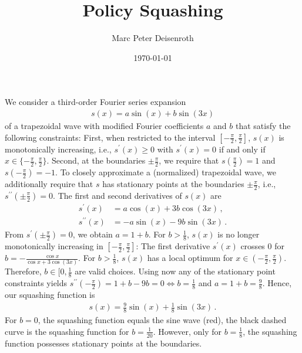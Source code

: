 \documentclass[11pt, a4paper]{article}
\title{Policy Squashing}
\author{Marc Peter Deisenroth}
\date{\today}
\begin{document}
\maketitle


We consider a third-order Fourier series expansion 
%
\begin{align*}
s(x) =  a\sin(x) + b\sin(3x)
\end{align*}
%
%
% 
of a trapezoidal wave with modified Fourier coefficients $a$ and $b$
that satisfy the following constraints: First, when restricted to the
interval $[-\tfrac{\pi}{2}, \tfrac{\pi}{2}]$, $s(x)$ is monotonically
increasing, i.e., $s^\prime(x) \geq 0$ with $s^\prime(x)=0$ if and
only if $x\in\{-\tfrac{\pi}{2}, \tfrac{\pi}{2}\}$. Second, at the
boundaries $\pm\tfrac{\pi}{2}$, we require that $s(\tfrac{\pi}{2}) =
1$ and $s(-\tfrac{\pi}{2}) = -1$.  To closely approximate a (normalized)
trapezoidal wave, we additionally require that $s$ has stationary
points at the boundaries $\pm\tfrac{\pi}{2}$, i.e.,
$s^{\prime\prime}(\pm\tfrac{\pi}{2}) = 0$. The first and second
derivatives of $s(x)$ are
%
\begin{align*}
s^\prime(x) &= a\cos (x) + 3b\cos(3x)\,,\\
s^{\prime\prime}(x) &= -a\sin(x) - 9b\sin(3x)\,.
\end{align*}
From $s^\prime(\pm\tfrac{\pi}{2})=0$, we obtain $a = 1+b$. For
$b>\tfrac{1}{8}$, $s(x)$ is no longer monotonically increasing in
$[-\tfrac{\pi}{2}, \tfrac{\pi}{2}]$: The first derivative
$s^\prime(x)$ crosses 0 for $b=-\tfrac{\cos x}{\cos x +
  3\cos(3x)}$. For $b>\tfrac{1}{8}$, $s(x)$ has a local optimum for
$x\in(-\tfrac{\pi}{2},\tfrac{\pi}{2})$. Therefore,
$b\in[0,\tfrac{1}{8}$ are valid choices.  Using now any of the
stationary point constraints yields $s^{\prime\prime}(-\tfrac{\pi}{2})
= 1+b - 9b = 0 \Leftrightarrow b = \tfrac{1}{8}$ and $a = 1+b =
\tfrac{9}{8}$. Hence, our squashing function is
%
\begin{align*}
s(x) = \tfrac{9}{8}\sin(x) + \tfrac{1}{8}\sin(3x)\,.
\end{align*}
%
For $b=0$, the squashing function equals the
sine wave (red), the black dashed curve is the squashing function for
$b=\tfrac{1}{20}$. However, only for $b=\tfrac{1}{8}$, the squashing
function possesses stationary points at the boundaries.
\end{document}

